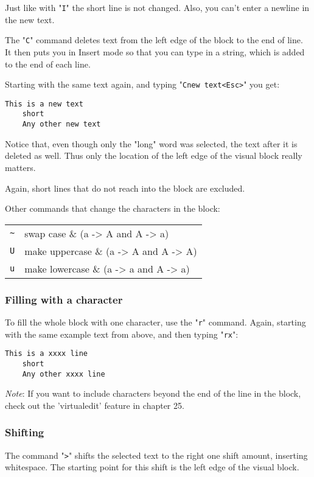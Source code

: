 Just like with "\verb!I!" the short line is not changed.
Also, you can't enter a newline in the new text.

The "\verb!C!" command deletes text from the left edge of the block to the end of line.
It then puts you in Insert mode so that you can type in a string, which is added to the end of each line.

Starting with the same text again, and typing "\verb!Cnew text<Esc>!" you get:

\begin{Verbatim}[samepage=true]
    This is a new text 
    short 
    Any other new text 
\end{Verbatim}

Notice that, even though only the "long" word was selected, the text after it is deleted as well.
Thus only the location of the left edge of the visual block really matters.

Again, short lines that do not reach into the block are excluded.

Other commands that change the characters in the block:
\begin{center}
				\begin{longtable}{c l}
								\verb:~: & swap case \& (a -> A and A -> a) \\
								\verb:U: & make uppercase \& (a -> A and A -> A) \\
								\verb:u: & make lowercase \& (a -> a and A -> a) \\
				\end{longtable}
\end{center}
\subsubsection{Filling with a character}
To fill the whole block with one character, use the "\verb!r!" command.
Again, starting with the same example text from above, and then typing "\verb!rx!":

\begin{Verbatim}[samepage=true]
    This is a xxxx line 
    short 
    Any other xxxx line 
\end{Verbatim}

\emph{Note}:
If you want to include characters beyond the end of the line in the block, check out the 'virtualedit' feature in chapter 25.

\subsubsection{Shifting}
The command "\verb!>!" shifts the selected text to the right one shift amount, inserting whitespace.
The starting point for this shift is the left edge of the visual block.

